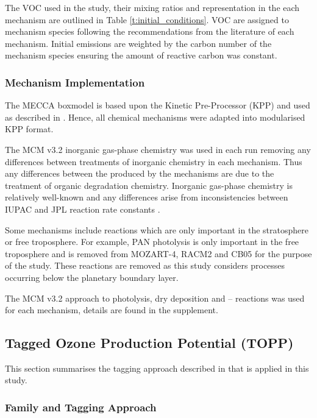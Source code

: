 The VOC used in the study, their mixing ratios and representation in the each mechanism are outlined in Table \ref{t:initial_conditions}.
VOC are assigned to mechanism species following the recommendations from the literature of each mechanism.
Initial emissions are weighted by the carbon number of the mechanism species ensuring the amount of reactive carbon was constant.

\subsubsection{Mechanism Implementation} %

The MECCA boxmodel \citep{Sander:2005} is based upon the Kinetic Pre-Processor (KPP) \citep{Damian:2002} and used as described in \citet{Butler:2011}. 
Hence, all chemical mechanisms were adapted into modularised KPP format.

The MCM v3.2 inorganic gas-phase chemistry was used in each run removing any differences between treatments of inorganic chemistry in each mechanism.
Thus any differences between the  produced by the mechanisms are due to the treatment of organic degradation chemistry.
Inorganic gas-phase chemistry is relatively well-known and any differences arise from inconsistencies between IUPAC and JPL reaction rate constants \citep{Emmerson:2009}.

Some mechanisms include reactions which are only important in the stratosphere or free troposphere.
For example, PAN photolysis is only important in the free troposphere \citep{Harwood:2003} and is removed from MOZART-4, RACM2 and CB05 for the purpose of the study. 
These reactions are removed as this study considers processes occurring below the planetary boundary layer.

The MCM v3.2 approach to photolysis, dry deposition and -- reactions was used for each mechanism, details are found in the supplement.

\subsection{Tagged Ozone Production Potential (TOPP)}
This section summarises the tagging approach described in \citet{Butler:2011} that is applied in this study.

\subsubsection[Ox Family and Tagging Approach]{ Family and Tagging Approach} \label{ss:tagging} %

